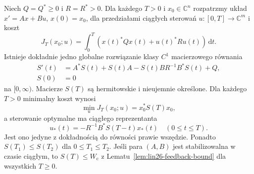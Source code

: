 \begin{lemat}
\label{lem:lin26-care-finite}
Niech \(Q=Q^*\ge0\)
i \(R=R^*>0\).
Dla każdego \(T>0\)
i \(x_0\in\mathbb C^n\)
rozpatrzmy układ
\(x'=Ax+Bu\), \(x(0)=x_0\),
dla przedziałami ciągłych
sterowań \(u\colon[0,T]\to\mathbb C^m\)
i koszt
\[
 J_T(x_0;u)=\int_0^T
 (x(t)^*Qx(t)+u(t)^*Ru(t))
 \,\mathrm dt.
\]
Istnieje dokładnie jedno
globalne rozwiązanie klasy \(C^1\)
macierzowego równania
\[
 \begin{aligned}
 S'(t)&=A^*S(t)+S(t)A
      -S(t)BR^{-1}B^*S(t)+Q,\\
 S(0)&=0
 \end{aligned}
 \tag{26.3}\label{eq:lin26-dre}
\]
na \([0,\infty)\).
Macierze \(S(T)\)
są hermitowskie i
nieujemnie określone.
Dla każdego \(T>0\)
minimalny koszt wynosi
\[
 \min_u J_T(x_0;u)=x_0^*S(T)x_0,
\]
a sterowanie optymalne ma
ciągłego reprezentanta
\[
 u_*(t)=-R^{-1}B^*S(T-t)x_*(t)
 \quad(0\le t\le T).
\]
Jest ono jedyne
z dokładnością do równości
prawie wszędzie.
Ponadto \(S(T_1)\le S(T_2)\)
dla \(0\le T_1\le T_2\).
Jeśli para \((A,B)\)
jest stabilizowalna
w czasie ciągłym,
to \(S(T)\le W_{\mathrm c}\)
z
Lematu~\ref{lem:lin26-feedback-bound}
dla wszystkich \(T\ge0\).
\end{lemat}
